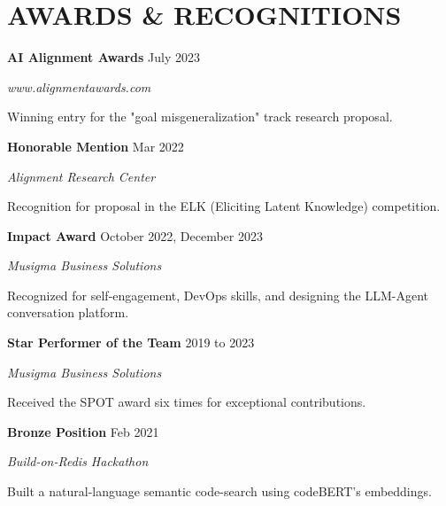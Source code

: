 \documentclass[fontsize=11pt]{article}
\newcommand{\sepspace}{\vspace*{1em}}
\newcommand{\NewPart}[1]{\section*{\uppercase{#1}}}
\newcommand{\AwardEntry}[4]{
    \noindent \textbf{#1} \hfill {#2} \par
    \noindent \textit{#3} \par
    \noindent \small #4
    \normalsize \par}
\begin{document}
\NewPart{AWARDS \& RECOGNITIONS}

\AwardEntry{AI Alignment Awards}{July 2023}{www.alignmentawards.com}
{Winning entry for the "goal misgeneralization" track research proposal.}

\sepspace

\AwardEntry{Honorable Mention}{Mar 2022}{Alignment Research Center}
{Recognition for proposal in the ELK (Eliciting Latent Knowledge) competition.}

\sepspace

\AwardEntry{Impact Award}{October 2022, December 2023}{Musigma Business Solutions}
{Recognized for self-engagement, DevOps skills, and designing the LLM-Agent conversation platform.}

\sepspace

\AwardEntry{Star Performer of the Team}{2019 to 2023}{Musigma Business Solutions}
{Received the SPOT award six times for exceptional contributions.}

\sepspace

\AwardEntry{Bronze Position}{Feb 2021}{Build-on-Redis Hackathon}
{Built a natural-language semantic code-search using codeBERT's embeddings.}
\end{document}
